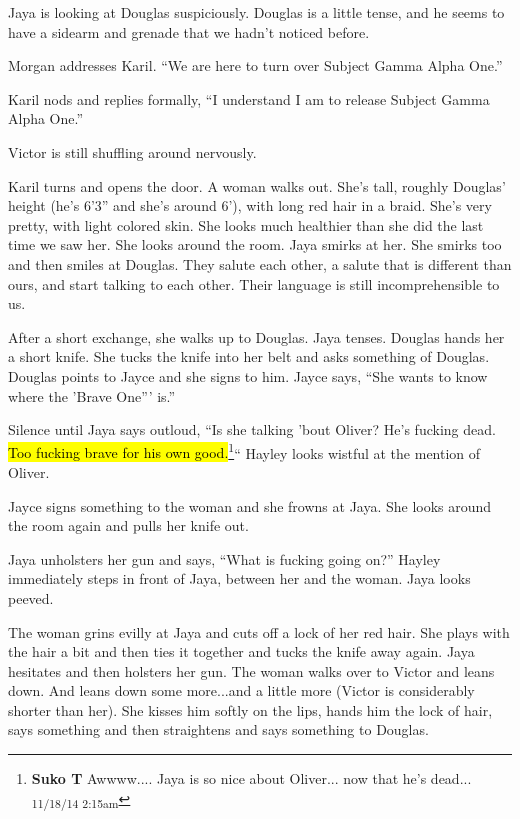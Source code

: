 Jaya is looking at Douglas suspiciously.  Douglas is a little tense, and he seems to have a sidearm and grenade that we hadn't noticed before.



Morgan addresses Karil.  ``We are here to turn over Subject Gamma Alpha One.''

Karil nods and replies formally, ``I understand I am to release Subject Gamma Alpha One.''

Victor is still shuffling around nervously.



Karil turns and opens the door.   A woman walks out. She's tall, roughly Douglas' height (he's 6'3'' and she's around 6'), with long red hair in a braid.  She's very pretty, with light colored skin.  She looks much healthier than she did the last time we saw her.  She looks around the room.  Jaya smirks at her.  She smirks too and then smiles at Douglas. They salute each other, a salute that is different than ours, and start talking to each other.  Their language is still incomprehensible to us.



After a short exchange, she walks up to Douglas.  Jaya tenses.  Douglas hands her a short knife.  She tucks the knife into her belt and asks something of Douglas.  Douglas points to Jayce and she signs to him.  Jayce says, ``She wants to know where the 'Brave One''' is.''



Silence until Jaya says outloud, ``Is she talking 'bout Oliver?  He's fucking dead.  \hl{Too fucking brave for his own good.}\footnote{\textbf{Suko T }Awwww.... Jaya is so nice about Oliver... now that he's dead... \textsubscript{11/18/14 2:15am}}``  Hayley looks wistful at the mention of Oliver.

Jayce signs something to the woman and she frowns at Jaya.  She looks around the room again and pulls her knife out.

Jaya unholsters her gun and says, ``What is fucking going on?''  Hayley immediately steps in front of Jaya, between her and the woman.  Jaya looks peeved.



The woman grins evilly at Jaya and cuts off a lock of her red hair.  She plays with the hair a bit and then ties it together and tucks the knife away again.  Jaya hesitates and then holsters her gun. The woman walks over to Victor and leans down.  And leans down some more...and a little more (Victor is considerably shorter than her).  She kisses him softly on the lips, hands him the lock of hair, says something and then straightens and says something to Douglas.



